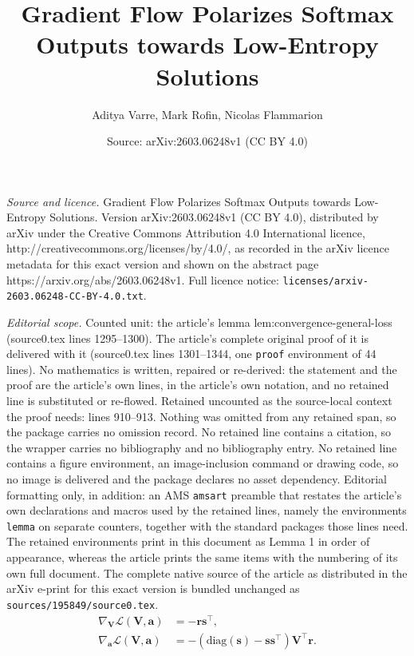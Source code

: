 \documentclass[10pt,a4paper]{amsart}
\title{Gradient Flow Polarizes Softmax Outputs towards Low-Entropy Solutions}
\author{Aditya Varre, Mark Rofin, Nicolas Flammarion}
\date{Source: arXiv:2603.06248v1 (CC BY 4.0)}
\newcommand{\VV}{\mathbf{V}}
\renewcommand{\aa}{\bm{a}}
\newcommand{\diag}[1]{\mathrm{diag}\left(#1\right)}
\newcommand{\loss}{\mathcal{L}}
\newcommand{\rrr}{\bm{r}}
\newcommand{\sos}{\bm{s}}
\begin{document}
\maketitle

\noindent\emph{Source and licence.} Gradient Flow Polarizes Softmax Outputs towards Low-Entropy Solutions. Version arXiv:2603.06248v1 (CC BY 4.0), distributed by arXiv under the Creative Commons Attribution 4.0 International licence, http://creativecommons.org/licenses/by/4.0/, as recorded in the arXiv licence metadata for this exact version and shown on the abstract page https://arxiv.org/abs/2603.06248v1. Full licence notice: \texttt{licenses/arxiv-2603.06248-CC-BY-4.0.txt}.\par\smallskip

\noindent\textit{Editorial scope.} Counted unit: the article's lemma lem:convergence-general-loss (source0.tex lines 1295--1300). The article's complete original proof of it is delivered with it (source0.tex lines 1301--1344, one \texttt{proof} environment of 44 lines). No mathematics is written, repaired or re-derived: the statement and the proof are the article's own lines, in the article's own notation, and no retained line is substituted or re-flowed.  Retained uncounted as the source-local context the proof needs: lines 910--913.  Nothing was omitted from any retained span, so the package carries no omission record.  No retained line contains a citation, so the wrapper carries no bibliography and no bibliography entry.  No retained line contains a figure environment, an image-inclusion command or drawing code, so no image is delivered and the package declares no asset dependency.  Editorial formatting only, in addition: an AMS \texttt{amsart} preamble that restates the article's own declarations and macros used by the retained lines, namely the environments \texttt{lemma} on separate counters, together with the standard packages those lines need.  The retained environments print in this document as Lemma 1 in order of appearance, whereas the article prints the same items with the numbering of its own full document.  The complete native source of the article as distributed in the arXiv e-print for this exact version is bundled unchanged as \texttt{sources/195849/source0.tex}.
\begin{align} \label{eq:gradients-general-loss}
    \nabla_{\VV} \loss(\VV, \aa) &=  - \rrr \sos^{\top},  \\
    \nabla_{\aa} \loss(\VV, \aa) &=  - \left( \diag{\sos} - \sos \sos^{\top} \right) \VV^{\top} \rrr.
\end{align}
\end{document}
